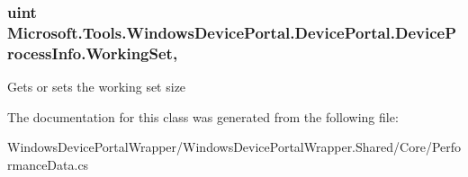 \subsubsection[{\texorpdfstring{Working\+Set}{WorkingSet}}]{\setlength{\rightskip}{0pt plus 5cm}uint Microsoft.\+Tools.\+Windows\+Device\+Portal.\+Device\+Portal.\+Device\+Process\+Info.\+Working\+Set\hspace{0.3cm}{\ttfamily [get]}, {\ttfamily [set]}}\hypertarget{class_microsoft_1_1_tools_1_1_windows_device_portal_1_1_device_portal_1_1_device_process_info_a64f82860f3f0f6ff379794a1d0134aa9}{}\label{class_microsoft_1_1_tools_1_1_windows_device_portal_1_1_device_portal_1_1_device_process_info_a64f82860f3f0f6ff379794a1d0134aa9}


Gets or sets the working set size 



The documentation for this class was generated from the following file\+:\begin{DoxyCompactItemize}
\item 
Windows\+Device\+Portal\+Wrapper/\+Windows\+Device\+Portal\+Wrapper.\+Shared/\+Core/Performance\+Data.\+cs\end{DoxyCompactItemize}
